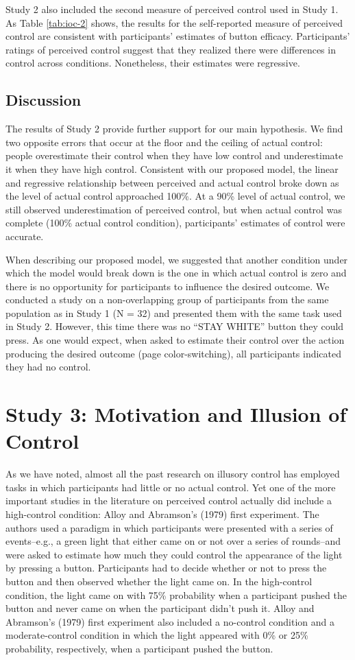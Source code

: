\documentclass[USenglish,letterpaper,12pt,extrafontsizes,oneside,onecolumn,final]{memoir}
\begin{document}
Study 2 also included the second measure of perceived control used in Study 1. As Table \ref{tab:ioc-2} shows, the results for the self-reported measure of perceived control are consistent with participants' estimates of button efficacy. Participants' ratings of perceived control suggest that they realized there were differences in control across conditions. Nonetheless, their estimates were regressive.

\subsection{Discussion}
The results of Study 2 provide further support for our main hypothesis. We find two opposite errors that occur at the floor and the ceiling of actual control: people overestimate their control when they have low control and underestimate it when they have high control. Consistent with our proposed model, the linear and regressive relationship between perceived and actual control broke down as the level of actual control approached 100\%. At a 90\% level of actual control, we still observed underestimation of perceived control, but when actual control was complete (100\% actual control condition), participants' estimates of control were accurate.

When describing our proposed model, we suggested that another condition under which the model would break down is the one in which actual control is zero and there is no opportunity for participants to influence the desired outcome. We conducted a study on a non-overlapping group of participants from the same population as in Study 1 (N = 32) and presented them with the same task used in Study 2. However, this time there was no ``STAY WHITE'' button they could press. As one would expect, when asked to estimate their control over the action producing the desired outcome (page color-switching), all participants indicated they had no control.


\section{Study 3: Motivation and Illusion of Control}
As we have noted, almost all the past research on illusory control has employed tasks in which participants had little or no actual control. Yet one of the more important studies in the literature on perceived control actually did include a high-control condition: Alloy and Abramson's (1979) first experiment. The authors used a paradigm in which participants were presented with a series of events--e.g., a green light that either came on or not over a series of rounds--and were asked to estimate how much they could control the appearance of the light by pressing a button. Participants had to decide whether or not to press the button and then observed whether the light came on. In the high-control condition, the light came on with 75\% probability when a participant pushed the button and never came on when the participant didn't push it. Alloy and Abramson's (1979) first experiment also included a no-control condition and a moderate-control condition in which the light appeared with 0\% or 25\% probability, respectively, when a participant pushed the button. 
\end{document}
